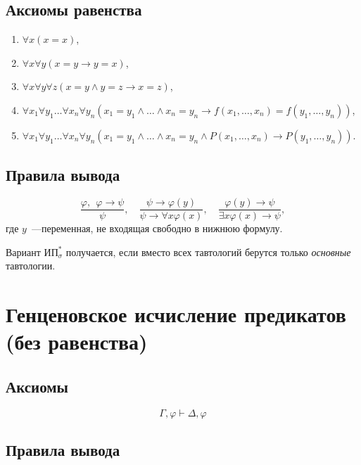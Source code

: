 \documentclass[a4paper,11pt]{article}
\begin{document}
\subsection{Аксиомы равенства}

\begin{enumerate}
\item $\forall x (x = x)$, 

\item $\forall x \forall y(x = y
\rightarrow y = x)$, 

\item $\forall x \forall y\forall z (x = y \land y
= z \rightarrow x = z)$, 

\item $\forall x_1 \forall y_1\ldots \forall
x_n \forall y_n (x_1 = y_1 \land \ldots \land x_n = y_n
\rightarrow f(x_1,\ldots,x_n) = f(y_1,\ldots, y_n))$, 

\item $\forall x_1
\forall y_1\ldots\forall x_n \forall y_n (x_1 = y_1 \land \ldots
\land x_n = y_n \land P(x_1,\ldots, x_n) \rightarrow
P(y_1,\ldots, y_n))$.
\end{enumerate}

\subsection{Правила вывода}

\[ \dfrac{\varphi,\ \ \varphi\rightarrow\psi}{\psi},\quad
\dfrac{\psi\rightarrow \varphi(y)}{\psi\rightarrow\forall
x\varphi(x)},\quad
\dfrac{\varphi(y)\rightarrow\psi}{\exists
x\varphi(x)\rightarrow\psi},\]
где $y$~—переменная, не входящая свободно в нижнюю формулу.

\noindent Вариант $\text{ИП}^*_\sigma$ получается, если вместо всех тавтологий берутся только {\it основные} тавтологии.

\pagebreak

\section{Генценовское исчисление предикатов (без равенства)}

\subsection{Аксиомы}

\[\Gamma,\varphi\vdash \Delta,\varphi\]

\subsection{Правила вывода}
\end{document}
